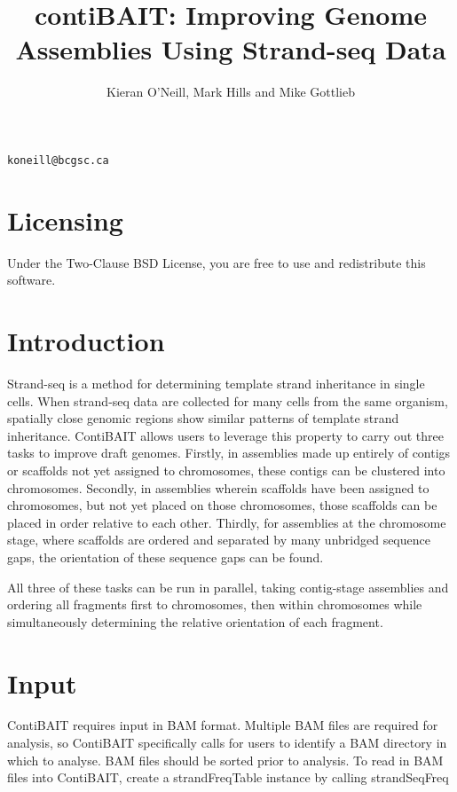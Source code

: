 \documentclass{article}
\title{contiBAIT: Improving Genome Assemblies Using Strand-seq Data}
\author{Kieran O'Neill, Mark Hills and Mike Gottlieb}
\begin{document}


\maketitle
\begin{center}
{\tt koneill@bcgsc.ca}
\end{center}

\textnormal{\normalfont}

\tableofcontents
\newpage

\section{Licensing}
Under the Two-Clause BSD License, you are free to use and redistribute this software.

\section{Introduction}
Strand-seq is a method for determining template strand inheritance in single cells.
When strand-seq data are collected for many cells from the same organism, spatially close genomic regions show similar patterns of template strand inheritance.
ContiBAIT allows users to leverage this property to carry out three tasks to improve draft genomes.
Firstly, in assemblies made up entirely of contigs or scaffolds not yet assigned to chromosomes, these contigs can be clustered into chromosomes.
Secondly, in assemblies wherein scaffolds have been assigned to chromosomes, but not yet placed on those chromosomes, those scaffolds can be placed in order relative to each other. Thirdly, for assemblies at the chromosome stage, where scaffolds are ordered and separated by many unbridged sequence gaps, the orientation of these sequence gaps can be found.  

All three of these tasks can be run in parallel, taking contig-stage assemblies and ordering all fragments first to chromosomes, then within chromosomes while simultaneously determining the relative orientation of each fragment.

\section{Input}
ContiBAIT requires input in BAM format. Multiple BAM files are required for analysis, so ContiBAIT specifically calls for users to identify a BAM directory in which to analyse. BAM files should be sorted prior to analysis.
To read in BAM files into ContiBAIT, create a strandFreqTable instance by calling strandSeqFreq 
\end{document}
